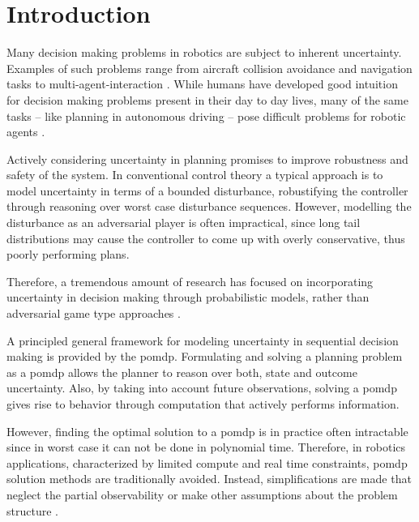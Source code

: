 \chapter{Introduction}\label{chap:introduction}

Many decision making problems in robotics are subject to inherent uncertainty.
Examples of such problems range from aircraft collision avoidance and
navigation tasks to multi-agent-interaction
\cite{kochenderfer2012next}. While humans have developed good
intuition for decision making problems present in their day to day lives, many
of the same tasks -- like planning in autonomous driving -- pose difficult
problems for robotic agents \cite{levinson2011towards}.

Actively considering uncertainty in planning promises to improve robustness and
safety of the system. In conventional control theory a typical approach is to model uncertainty in terms of a bounded
disturbance, robustifying the controller through reasoning over worst case
disturbance sequences. However, modelling the disturbance as an adversarial
player is often impractical, since long tail distributions may cause the
controller to come up with overly conservative, thus poorly performing
plans.

Therefore, a tremendous amount of research has focused on incorporating
uncertainty in decision making through probabilistic models, rather than
adversarial game type approaches \cite{roy1999coastal, amato2015planning,
fisac2018probabilistically, choudhury2019dynamic}.

 A principled
general framework for modeling uncertainty in sequential decision making is
provided by the \ac{pomdp}. Formulating and solving a planning problem as
a \ac{pomdp} allows the planner to reason over both, state and outcome
uncertainty. Also, by taking into account future observations, solving
a \ac{pomdp} gives rise to behavior through computation that actively performs
information.

However, finding the optimal solution to a \ac{pomdp} is in practice often
intractable since in worst case it can not be done in polynomial time. Therefore, in robotics applications, characterized by limited compute
and real time constraints, \ac{pomdp} solution methods are traditionally
avoided. Instead, simplifications are made that neglect the partial
observability or make other assumptions about the problem structure
\cite{sadigh2016information, fisac2018probabilistically}.


